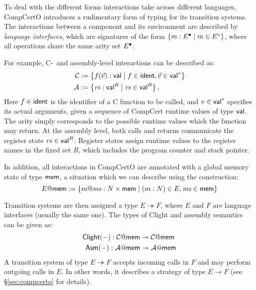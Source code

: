 \documentclass[sigplan,10pt,authordraft]{acmart}
\begin{document}
To deal with the different forms
interactions take
across different languages,
CompCertO introduces a rudimentary form of typing
for its transition systems.
The interactions between a component and its environment
are described by \emph{language interfaces},
which are signatures of the form
$\{ m : E^\bullet \mid m \in E^\circ \}$,
where all operations share the same arity set $E^\bullet$.

For example, C-~and assembly-level interactions
can be described as:
\begin{align*}
  \mathcal{C} &:=
    \big\{ f(\vec{v}) :  \mathsf{val}  \mathrel{\big|}
       f \in  \mathsf{ident} , \vec{v} \in  \mathsf{val} ^* \big\}
  \\
  \mathcal{A} &:=
    \big\{ \mathit{rs} :  \mathsf{val} ^R \mathrel{\big|}
       \mathit{rs} \in  \mathsf{val} ^R \big\}
  \,,
\end{align*}
Here $f \in  \mathsf{ident} $ is the identifier of
a C function to be called,
and $v \in  \mathsf{val} ^*$ specifies its actual arguments,
given a sequence of CompCert runtime values of type $ \mathsf{val} $.
The arity simply corresponds to
the possible runtime values which the function may return.
At the assembly level,
both calls and returns communicate
the register state $\mathit{rs} \in  \mathsf{val} ^R$.
Register states assign runtime values
to the register names in the fixed set $R$,
which includes the program counter and stack pointer.

In addition,
all interactions in CompCertO
are annotated with a global memory state of type $ \mathsf{mem} $,
a situation which we can describe using the construction:
\[
  E@ \mathsf{mem}  := \{ m@\mathit{ms} : N \times  \mathsf{mem}  \mid
                   (m : N) \in E, \mathit{ms} \in  \mathsf{mem}  \}
\]

Transition systems
are then assigned a type
$E \twoheadrightarrow F$,
where $E$ and $F$ are
language interfaces (usually the same one).
The types of Clight and assembly semantics
can be given as:
\begin{align*}
   \mathsf{Clight} (-) :
    \mathcal{C}@ \mathsf{mem} 
   &\twoheadrightarrow
    \mathcal{C}@ \mathsf{mem} 
  \\
   \mathsf{Asm} (-) :
    \mathcal{A}@ \mathsf{mem} 
   &\twoheadrightarrow
    \mathcal{A}@ \mathsf{mem} 
\end{align*}
A transition system of type $E \twoheadrightarrow F$
accepts incoming calls in $F$
and may perform outgoing calls in $E$.
In other words,
it describes a strategy of type $E \rightarrow F$
(see \S\ref{sec:compcerto} for details).

\end{document}
